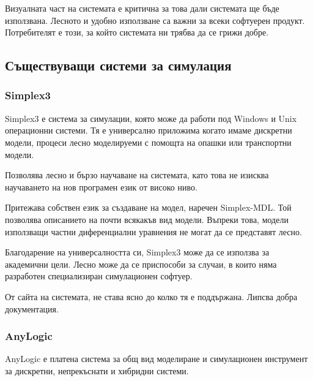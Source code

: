 		Визуалната част на системата е критична за това дали системата ще бъде използвана.
		Лесното и удобно използване са важни за всеки софтуерен продукт. 
		Потребителят е този, за който системата ни трябва да се грижи добре. \cite{Microsoft}
	
	\subsection{Съществуващи системи за симулация}
	
		\subsubsection{Simplex3}
		
			Simplex3 е система за симулации, която може да работи под Windows и Unix операционни системи.
			Тя е универсално приложима когато имаме дискретни модели, процеси 
			лесно моделируеми с помощта на опашки или транспортни модели.
			
 
				Позволява лесно и бързо научаване на системата, като това не изисква
				научаването на нов програмен език от високо ниво.			

				
				Притежава собствен език за създаване на модел, наречен Simplex-MDL. 
				Той позволява описанието на почти всякакъв вид модели. Въпреки това,
				модели използващи частни диференциални уравнения не могат да се представят
				лесно.
			
			
				Благодарение на универсалността си, Simplex3 може да се използва за академични цели.
				Лесно може да се приспособи за случаи, в които няма разработен специализиран симулационен
				софтуер. 
			
			
				От сайта на системата, не става ясно до колко тя е поддържана. 
				Липсва добра документация.\cite{Simplex3}
		
		\subsubsection{AnyLogic}
		
			AnyLogic е платена система за общ вид моделиране и симулационен инструмент за 
			дискретни, непрекъснати и хибридни системи.
			
			
